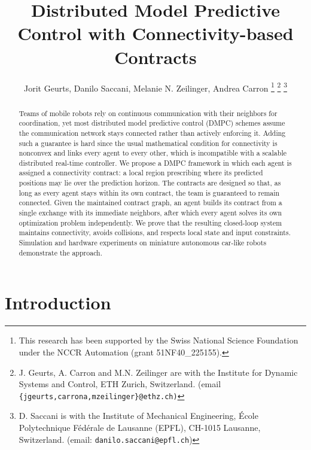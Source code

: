 \documentclass[letterpaper, 10 pt, conference]{ieeeconf}  %
\title{\LARGE \bf
	Distributed Model Predictive Control with Connectivity-based Contracts
}
\author{Jorit Geurts, Danilo Saccani, Melanie N. Zeilinger, Andrea Carron%
	\thanks{This research has been supported by the Swiss National Science Foundation under the NCCR Automation (grant 51NF40\_225155).}%
	\thanks{J. Geurts, A. Carron and M.N. Zeilinger are with the Institute for Dynamic Systems and Control, ETH Zurich, Switzerland. (email \texttt{\{jgeurts,carrona,mzeilinger\}@ethz.ch)}  }%
	\thanks{D. Saccani is with the Institute of Mechanical Engineering, École Polytechnique Fédérale de Lausanne (EPFL), CH-1015 Lausanne, Switzerland. (email: \texttt{danilo.saccani@epfl.ch})}%
}
\begin{document}
\maketitle
\thispagestyle{empty}
\pagestyle{empty}


\begin{abstract}
	Teams of mobile robots rely on continuous communication with their
	neighbors for coordination, yet most distributed model predictive control
	(DMPC) schemes assume the communication network stays connected rather
	than actively enforcing it. Adding such a guarantee is hard since the
	usual mathematical condition for connectivity is nonconvex and links every
	agent to every other, which is incompatible with a scalable distributed real-time
	controller.
	We propose a DMPC framework in which each agent is assigned a
	connectivity contract: a local region prescribing where its predicted
	positions may lie over the prediction horizon. The contracts are designed
	so that, as long as every agent stays within its own contract, the team
	is guaranteed to remain connected. Given the maintained contract graph, an agent builds its contract from a
	single exchange with its immediate neighbors, after which every agent
	solves its own optimization problem independently. We prove that the resulting closed-loop system maintains
	connectivity, avoids collisions, and respects local state and input
	constraints. Simulation and hardware experiments on miniature autonomous
	car-like robots demonstrate the approach.
\end{abstract}




\section{Introduction}
\end{document}
